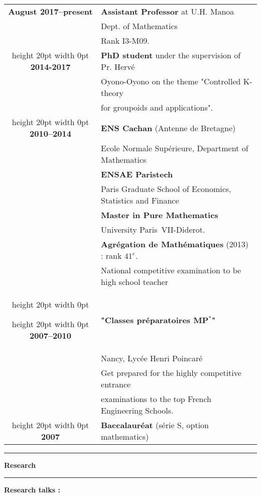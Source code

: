 \documentclass[a4paper,11pt]{article}
\newcommand\espace{\vrule height 20pt width 0pt}
\newcommand{\titre}[1]{%
	\begin{center}
	\bigskip
	\rule{\textwidth}{1pt}
	\par\vspace{0.1cm}
        \textbf{\large #1}
	\par\rule{\textwidth}{1pt}
	\end{center}
	\bigskip
	}
\begin{document}
\begin{tabular}{cp{}}

\textbf{August 2017--present} &  \textbf{Assistant Professor} at U.H. Manoa  \\
						& Dept. of Mathematics\\
						& Rank I3-M09. \\
\espace
\textbf{2014-2017} &  \textbf{PhD student} under the supervision of Pr. Hervé  \\
						& Oyono-Oyono on the theme "Controlled K-theory \\
						& for groupoids and applications". \\
\espace
\textbf{2010--2014} &  \textbf{ENS Cachan} (Antenne de Bretagne) \\
				    & 	Ecole Normale Supérieure, Department of Mathematics \\
                              & \textbf{ENSAE Paristech}\\
				&	Paris Graduate School of Economics, Statistics and Finance\\
                                   & \textbf{Master in Pure Mathematics}\\  & University Paris~VII-Diderot. \\
                                   & \textbf{Agrégation de Mathématiques} (2013) : rank $41^e$. \\
				& National competitive examination to be high school teacher\\
\espace

\espace
\textbf{2007--2010} &\textbf{ "Classes préparatoires MP$^*$" } \\
					& Nancy, Lycée Henri Poincaré\\
					& Get prepared for the highly competitive entrance \\
				& examinations to the top French Engineering Schools.\\

\espace
\textbf{2007} & \textbf{Baccalauréat} (série S, option mathematics) 
 \\

\end{tabular}

\newpage
\titre{Research}

\textbf{Research talks :}\\
\end{document}
